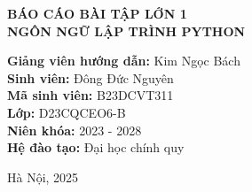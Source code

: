\documentclass[12pt]{report}
\begin{document}
\begin{titlepage}
    \vspace{1cm}
{\Large \textbf{BÁO CÁO BÀI TẬP LỚN 1}}\\[0.5cm]
{\LARGE \textbf{NGÔN NGỮ LẬP TRÌNH PYTHON}}\\
    \vfill
    \begin{flushleft}
    \hspace{2.5cm}\textbf{Giảng viên hướng dẫn:} \hspace{0.7cm} Kim Ngọc Bách \\
    \hspace{2.5cm}\textbf{Sinh viên:} \hspace{3.35cm} Đông Đức Nguyên\\
    \hspace{2.5cm}\textbf{Mã sinh viên:} \hspace{2.6cm} B23DCVT311\\
    \hspace{2.5cm}\textbf{Lớp:} \hspace{4.5cm} D23CQCEO6-B\\
    \hspace{2.5cm}\textbf{Niên khóa:} \hspace{3.2cm} 2023 - 2028   \\
    \hspace{2.5cm}\textbf{Hệ đào tạo:} \hspace{3cm} Đại học chính quy\\
   
    \end{flushleft}
    
    \vfill
    {\large Hà Nội, 2025}
\end{titlepage}
\end{document}
